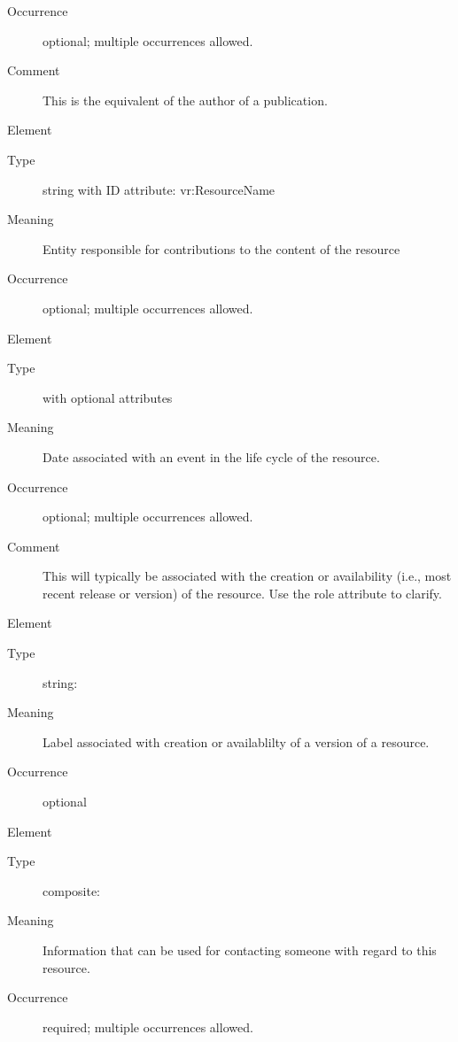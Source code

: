 \documentclass[11pt,a4paper]{ivoa}
\begin{document}
\begin{generated}
\begin{bigdescription}
\begin{description}
\item[Occurrence] optional; multiple occurrences allowed.
\item[Comment]
                This is the equivalent of the author of a publication.


\end{description}
\item[Element \xmlel{contributor}]
\begin{description}
\item[Type] string with ID attribute: vr:ResourceName
\item[Meaning]
               Entity responsible for contributions to the content of
               the resource

\item[Occurrence] optional; multiple occurrences allowed.

\end{description}
\item[Element \xmlel{date}]
\begin{description}
\item[Type]  with optional attributes
\item[Meaning]
               Date associated with an event in the life cycle of the
               resource.

\item[Occurrence] optional; multiple occurrences allowed.
\item[Comment]
               This will typically be associated with the creation or
               availability (i.e., most recent release or version) of
               the resource.  Use the role attribute to clarify.


\end{description}
\item[Element \xmlel{version}]
\begin{description}
\item[Type] string: 
\item[Meaning]
               Label associated with creation or availablilty of a version of
               a resource.

\item[Occurrence] optional

\end{description}
\item[Element \xmlel{contact}]
\begin{description}
\item[Type] composite: 
\item[Meaning]
               Information that can be used for contacting someone with
               regard to this resource.

\item[Occurrence] required; multiple occurrences allowed.

\end{description}


\end{bigdescription}\endgroup

\endgroup
\end{generated}
\end{document}
